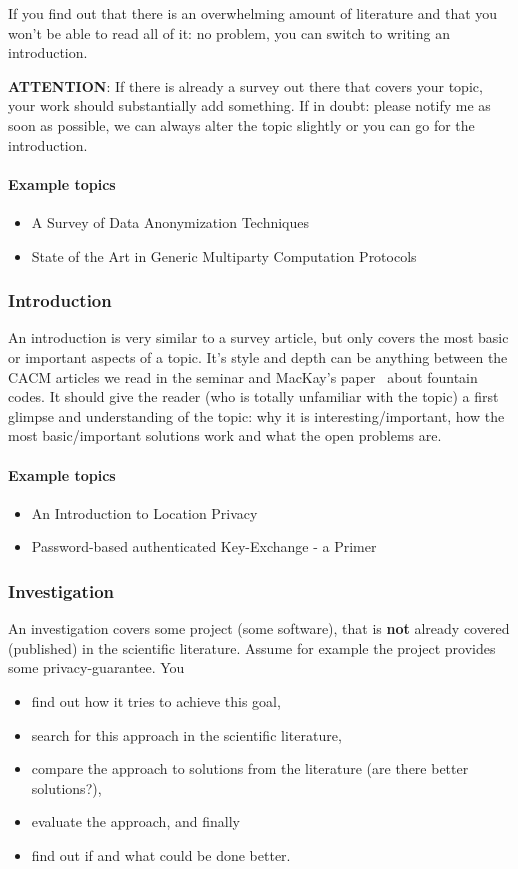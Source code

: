 \documentclass[twocolumn, a4paper, 10pt]{article}
\begin{document}
If you find out that there is an overwhelming amount of literature and that you won't be able to read all of it: no problem, you can switch to writing an introduction.

\textbf{ATTENTION}: If there is already a survey out there that covers your topic, your work should substantially add something. If in doubt: please notify me as soon as possible, we can always alter the topic slightly or you can go for the introduction.

\paragraph{Example topics}
\begin{itemize}
	\item A Survey of Data Anonymization Techniques
	\item State of the Art in Generic Multiparty Computation Protocols
\end{itemize}

\subsubsection{Introduction}
An introduction is very similar to a survey article, but only covers the most basic or important aspects of a topic. It's style and depth can be anything between the CACM articles we read in the seminar and MacKay's paper~\cite{mackay2005fountain} about fountain codes. It should give the reader (who is totally unfamiliar with the topic) a first glimpse and understanding of the topic: why it is interesting/important, how the most basic/important solutions work and what the open problems are. 

\paragraph{Example topics}
\begin{itemize}
	\item An Introduction to Location Privacy
	\item Password-based authenticated Key-Exchange - a Primer
\end{itemize}

\subsubsection{Investigation}
An investigation covers some project (some software), that is \textbf{not} already covered (published) in the scientific literature. Assume for example the project provides some privacy-guarantee. You
\begin{itemize}
	\item find out how it tries to achieve this goal,
	\item search for this approach in the scientific literature,
	\item compare the approach to solutions from the literature (are there better solutions?),
	\item evaluate the approach, and finally
	\item find out if and what could be done better.
\end{itemize}
\end{document}
